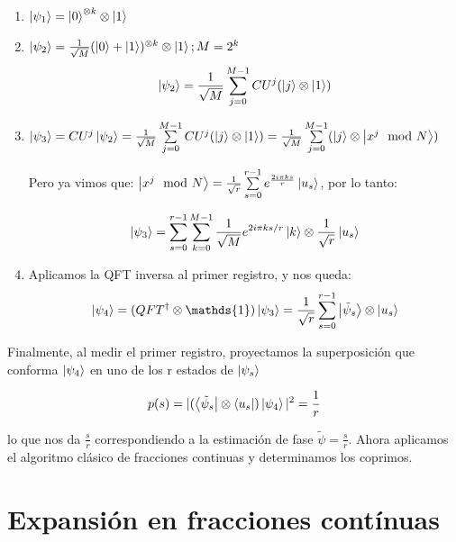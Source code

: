 \begin{enumerate}
    \item $\ket{\psi_1} = \ket{0}^{\otimes k} \otimes \ket{1}$
    \item $\ket{\psi_2} = \frac{1}{\sqrt{M}} (\ket{0} + \ket{1})^{\otimes k} \otimes \ket{1}; M=2^k$
        \begin{equation}
            \ket{\psi_2} = \frac{1}{\sqrt{M}} \sum_{j=0}^{M-1} CU^j (\ket{j} \otimes \ket{1})
        \end{equation}
    \item $\ket{\psi_3} = CU^j \ket{\psi_2} = \frac{1}{\sqrt{M}} \sum\limits_{j=0}^{M-1} CU^j (\ket{j} \otimes \ket{1}) = \frac{1}{\sqrt{M}} \sum\limits_{j=0}^{M-1} (\ket{j} \otimes \ket{x^j \mod N})$

        Pero ya vimos que: $\ket{x^j \mod N} = \frac{1}{\sqrt{r}} \sum\limits_{s=0}^{r-1} e^{\frac{2 i \pi k s}{r}} \ket{u_s}$, por lo tanto:

        \begin{equation}
            \ket{\psi_3} = \sum\limits_{s=0}^{r-1}\sum_{k=0}^{M-1} \frac{1}{\sqrt{M}} e^{2 i \pi k s/r} \ket{k} \otimes \frac{1}{\sqrt{r}} \ket{u_s}
        \end{equation}

    \item Aplicamos la QFT inversa al primer registro, y nos queda:
        \begin{equation}
            \ket{\psi_4} = (QFT^\dagger \otimes \mathds{1}) \ket{\psi_3} = \frac{1}{\sqrt{r}} \sum\limits_{s=0}^{r-1} \ket{\tilde{\psi}_s} \otimes \ket{u_s}
        \end{equation}
\end{enumerate}

Finalmente, al medir el primer registro, proyectamos la superposición que conforma $\ket{\psi_4}$ en uno de los r estados de $\ket{\psi_s}$

\begin{equation}
    p(s) = |(\bra{\tilde{\psi}_s} \otimes \bra{u_s}) \ket{\psi_4}|^2 = \frac{1}{r}
\end{equation}

lo que nos da $\frac{s}{r}$ correspondiendo a la estimación de fase $\tilde{\psi} = \frac{s}{r}$. Ahora aplicamos el algoritmo clásico de fracciones continuas y determinamos los coprimos.

\section{Expansión en fracciones contínuas}

